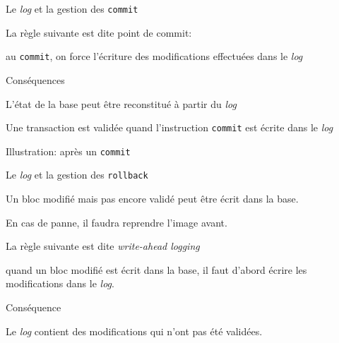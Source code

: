 \documentclass[aspectratio=169, handout]{beamer} %
\begin{document}
 
\begin{frame}{Le \textit{log} et la gestion des \texttt{commit}}

La règle suivante est dite \alert{point de commit}:

\vfill

\begin{redbullet}

  \item au \texttt{commit}, on force l'écriture des modifications effectuées
  dans le \textit{log}
\end{redbullet}

\vfill
Conséquences
\vfill

\begin{blocgauche}
\begin{redbullet}
  \item \alert{L'état de la base} peut être reconstitué à partir du \textit{log}
\item Une transaction est validée  quand l'instruction \texttt{commit}  est écrite dans le \textit{log}
\end{redbullet}
\end{blocgauche}

\end{frame}
 
\begin{frame}{Illustration: après un \texttt{commit}}


\end{frame}
 

 
\begin{frame}{Le \textit{log} et la gestion des \texttt{rollback}}

Un bloc \alert{modifié} mais pas encore \alert{validé} peut être écrit
dans la base. 

\vfill

En cas de panne, il faudra reprendre l'image avant.

\vfill

La règle suivante est dite \textit{write-ahead logging}

\begin{redbullet}
  \item quand un bloc modifié est écrit dans la base, il faut \alert{d'abord} 
      écrire les modifications dans le \textit{log}.
\end{redbullet}

\vfill
Conséquence
\vfill

\begin{blocgauche}
\begin{redbullet}
  \item Le \textit{log} contient des modifications qui n'ont pas été validées.
\end{redbullet}
\end{blocgauche}

\end{frame}
\end{document}
